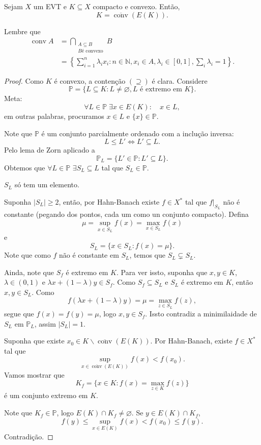 \documentclass[portuguese]{article}
\theoremstyle{definition}
\newcommand{\N}{\mathbb{N}}
\begin{document}
	\begin{teo}
		Sejam $X$ um EVT e $K\subseteq X$ compacto e convexo. Então,
		\[K=\overline{\operatorname{conv}}(E(K)).\]
		
	\end{teo}
	\begin{obs}
		Lembre que
		\begin{align*}
			\operatorname{conv}A&=\bigcap_{\substack{A\subseteq B\\ B\text{é convexo}}}B\\
			&=\left\{\sum_{i=1}^n\lambda_ix_i:n\in\N,x_i\in A,\lambda_i\in[0,1],\sum_i\lambda_i=1\right\}.
		\end{align*}
	\end{obs}
	\begin{proof}
		Como $K$ é convexo, a contenção $(\supseteq)$ é clara. Considere
		\[\mathbb{P}=\{L\subseteq K:L\neq\varnothing, L\text{ é extremo em }K\}.\]
		Meta:
		\[\forall L\in\mathbb{P}\;\exists x\in E(K):\quad x\in L,\]
		em outras palabras, procuramos $x\in L$ e $\{x\}\in\mathbb{P}$.
		
		Note que $\mathbb{P}$ é um conjunto parcialmente ordenado com a inclução inversa:
		\[L\leq L'\iff L'\subseteq L.\]
		Pelo lema de Zorn aplicado a
		\[\mathbb{P}_L=\{L'\in\mathbb{P}:L'\subseteq L\}.\]
		Obtemos que $\forall L\in\mathbb{P}$ $\exists S_L\subseteq L$ tal que $S_L\in\mathbb{P}$.
		\begin{af*}
			$S_L$ só tem um elemento.
		\end{af*}
		Suponha $|S_L|\geq2$, então, por Hahn-Banach existe $f\in X^*$ tal que $f|_{S_L}$ não é constante (pegando dos pontos, cada um como un conjunto compacto). Defina
		\[\mu=\sup_{x\in S_L}f(x)=\max_{x\in S_L}f(x)\]
		e
		\[S_L=\{x\in S_L:f(x)=\mu\}.\]
		Note que como $f$ não é constante em $S_L$, temos que $S_L\subsetneq S_L$.
		
		Ainda, note que $S_f$ é extremo em $K$. Para ver issto, suponha que $x,y\in K$, $\lambda\in(0,1)$ e $\lambda x+(1-\lambda)y\in S_f$. Como $S_f\subseteq S_L$ e $S_L$ é extremo em $K$, então $x,y\in S_L$. Como
		\[f(\lambda x+(1-\lambda)y)=\mu=\max_{z\in S_L}f(z),\]
		segue que $f(x)=f(y)=\mu$, logo $x,y\in S_f$. Issto contradiz a minimilaidade de $S_L$ em $\mathbb{P}_L$, assim $|S_L|=1$.
		
		Suponha que existe $x_0\in K\backslash\overline{\operatorname{conv}}(E(K))$. Por Hahn-Banach, existe $f\in X^*$ tal que 
		\[\sup_{x\in\overline{\operatorname{conv}}(E(K))}f(x)<f(x_0).\]
		Vamos mostrar que
		\[K_f=\{x\in K:f(x)=\max_{z\in K}f(z)\}\]
		é um conjunto extremo em $K$.
		
		Note que $K_f\in\mathbb{P}$, logo $E(K)\cap K_f\neq\varnothing$. Se $y\in E(K)\cap K_f$,
		\[f(y)\leq\sup_{x\in E(K)}f(x)<f(x_0)\leq f(y).\]
		Contradição.
	\end{proof}
\end{document}
